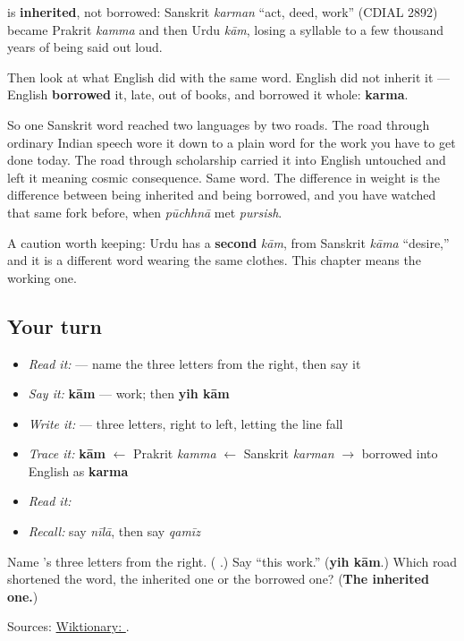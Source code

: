 \begin{cousinweb}
\textbf{} is \textbf{inherited}, not borrowed: Sanskrit \emph{karman} \textquotedblleft{}act, deed, work\textquotedblright{} (CDIAL 2892) became Prakrit \emph{kamma} and then Urdu \emph{kām}, losing a syllable to a few thousand years of being said out loud.

Then look at what English did with the same word. English did not inherit it — English \textbf{borrowed} it, late, out of books, and borrowed it whole: \textbf{karma}.

So one Sanskrit word reached two languages by two roads. The road through ordinary Indian speech wore it down to a plain word for the work you have to get done today. The road through scholarship carried it into English untouched and left it meaning cosmic consequence. Same word. The difference in weight is the difference between being inherited and being borrowed, and you have watched that same fork before, when \emph{pūchhnā} met \emph{pursish}.

A caution worth keeping: Urdu has a \textbf{second} \emph{kām}, from Sanskrit \emph{kāma} \textquotedblleft{}desire,\textquotedblright{} and it is a different word wearing the same clothes. This chapter means the working one.
\end{cousinweb}

\subsection*{Your turn}
\begin{itemize}
\raggedright
  \item \emph{Read it:}  — name the three letters from the right, then say it
  \item \emph{Say it:} \textbf{kām} — work; then \textbf{yih kām}
  \item \emph{Write it:}  — three letters, right to left, letting the line fall
  \item \emph{Trace it:} \textbf{kām} $\leftarrow$ Prakrit \emph{kamma} $\leftarrow$ Sanskrit \emph{karman} $\to$ borrowed into English as \textbf{karma}
  \item \emph{Read it:} \textbf{}
  \item \emph{Recall:} say \emph{nīlā}, then say \emph{qamīz}
\end{itemize}

\begin{tcolorbox}[breakable,colback=teal!4,colframe=teal!35!black,title={Before you move on}]
Name \textbf{}'s three letters from the right. (\textbf{  }.) Say \textquotedblleft{}this work.\textquotedblright{} (\textbf{yih kām}.) Which road shortened the word, the inherited one or the borrowed one? (\textbf{The inherited one.})

Sources: \href{https://en.wiktionary.org/wiki/\%DA\%A9\%D8\%A7\%D9\%85}{Wiktionary: }.
\end{tcolorbox}
